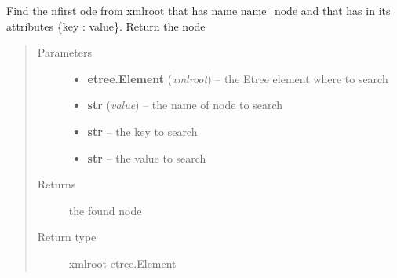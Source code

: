 \documentclass[a4paper,10pt,english]{sphinxmanual}
\begin{document}

\begin{fulllineitems}
\label{commands/apidoc/src:src.xmlManager.find_node_by_attrib}
Find the nfirst ode from xmlroot that has name name\_node and that has in 
its attributes \{key : value\}. Return the node
\begin{quote}\begin{description}
\item[{Parameters}] \leavevmode\begin{itemize}
\item {} 
\textbf{etree.Element} (\emph{xmlroot}) -- the Etree element where to search

\item {} 
\textbf{str} (\emph{value}) -- the name of node to search

\item {} 
\textbf{str} -- the key to search

\item {} 
\textbf{str} -- the value to search

\end{itemize}

\item[{Returns}] \leavevmode
the found node

\item[{Return type}] \leavevmode
xmlroot etree.Element

\end{description}\end{quote}

\end{fulllineitems}

\end{document}
